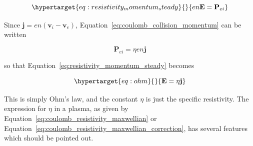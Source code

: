 \documentclass[
  notoc %
]{tufte-book}
\begin{document}
\begin{equation}\protect\hypertarget{eq:resistivity_momentum_steady}{}{
en\mathbf{E} = \mathbf{P}_{ei}
}\label{eq:resistivity_momentum_steady}\end{equation}

Since \(\mathbf{j}=en(\mathbf{v}_i-\mathbf{v}_e)\),
Equation~\ref{eq:coulomb_collision_momentum} can be written

\[
\mathbf{P}_{ei} = \eta en\mathbf{j}
\]

so that Equation~\ref{eq:resistivity_momentum_steady} becomes

\begin{equation}\protect\hypertarget{eq:ohm}{}{
\mathbf{E} = \eta\mathbf{j}
}\label{eq:ohm}\end{equation}

This is simply Ohm's law, and the constant \(\eta\) is just the specific
resistivity. The expression for \(\eta\) in a plasma, as given by
Equation~\ref{eq:coulomb_resistivity_maxwellian} or
Equation~\ref{eq:coulomb_resistivity_maxwellian_correction}, has several
features which should be pointed out.
\end{document}
